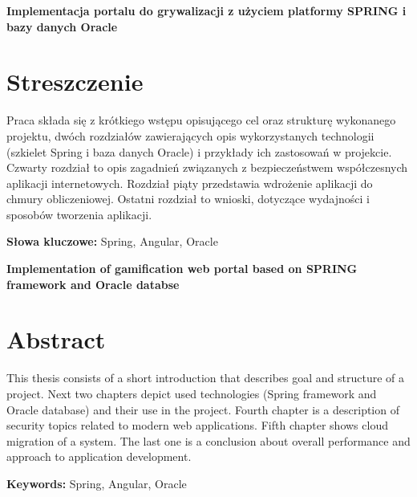 \newpage
\begin{center}
\large \bf
Implementacja portalu do grywalizacji z użyciem platformy SPRING i bazy danych Oracle
\end{center}

\section*{Streszczenie}
Praca składa się z krótkiego wstępu opisującego cel oraz strukturę wykonanego projektu, dwóch rozdziałów
zawierających opis wykorzystanych technologii (szkielet Spring i baza danych Oracle) i przykłady ich zastosowań w projekcie. Czwarty rozdział to opis zagadnień związanych z bezpieczeństwem współczesnych aplikacji internetowych. Rozdział piąty przedstawia wdrożenie aplikacji do chmury obliczeniowej. Ostatni rozdział to wnioski, dotyczące wydajności i sposobów tworzenia aplikacji.

\bigskip
{\noindent\bf Słowa kluczowe:} Spring, Angular, Oracle

\vskip 2cm


\begin{center}
\large \bf
Implementation of gamification web portal based on SPRING framework and Oracle databse
\end{center}

\section*{Abstract}
This thesis consists of a short introduction that describes goal and structure of a project. Next two chapters depict used technologies (Spring framework and Oracle database) and their use in the project. Fourth chapter is a description of security topics related to modern web applications. Fifth chapter shows cloud migration of a system. The last one is a conclusion about overall performance and approach to application development.

\bigskip
{\noindent\bf Keywords:} Spring, Angular, Oracle

\vfill